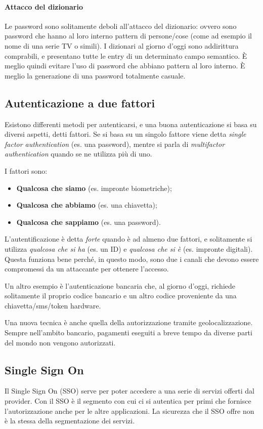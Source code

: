 \paragraph*{Attacco del dizionario}
Le password sono solitamente deboli all'attacco del dizionario: ovvero sono
password che hanno al loro interno pattern di persone/cose (come ad esempio il
nome di una serie TV o simili). I dizionari al giorno d'oggi sono addirittura
comprabili, e presentano tutte le entry di un determinato campo semantico.
È meglio quindi evitare l'uso di password che abbiano pattern al loro interno.
È meglio la generazione di una password totalmente casuale.

\subsection{Autenticazione a due fattori}

Esistono differenti metodi per autenticarsi, e una buona autenticazione si
basa su diversi aspetti, detti fattori. Se si basa su un singolo fattore viene
detta \textit{single factor authentication} (es. una password), mentre si
parla di \textit{multifactor authentication} quando se ne utilizza più di uno.

I fattori sono:
\begin{itemize}
 \item \textbf{Qualcosa che siamo} (es. impronte biometriche);
 \item \textbf{Qualcosa che abbiamo} (es. una chiavetta);
 \item \textbf{Qualcosa che sappiamo} (es. una password).
\end{itemize}
L'autentificazione è detta \emph{forte} quando è ad almeno due fattori, e
solitamente si utilizza \emph{qualcosa che si ha} (es. un ID) e \emph{qualcosa
che si è} (es. impronte digitali). Questa funziona bene perché, in questo
modo, sono due i canali che devono essere compromessi da un attaccante per
ottenere l'accesso.

Un altro esempio è l'autenticazione bancaria che, al giorno d'oggi, richiede
solitamente il proprio codice bancario e un altro codice proveniente da una
chiavetta/sms/token hardware.

Una nuova tecnica è anche quella della autorizzazione tramite
geolocalizzazione. Sempre nell'ambito bancario, pagamenti eseguiti a breve
tempo da diverse parti del mondo non vengono autorizzati.

\subsection{Single Sign On}
Il Single Sign On (SSO) serve per poter accedere a una serie di servizi offerti dal
provider. Con il SSO è il segmento con cui ci si autentica per primi che
fornisce l'autorizzazione anche per le altre applicazioni.
La sicurezza che il SSO offre non è la stessa della segmentazione dei
servizi.

